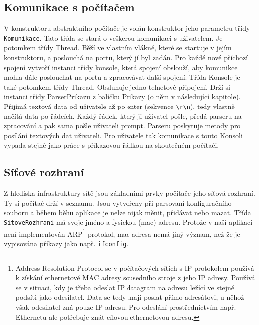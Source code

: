 \subsection{Komunikace s počítačem}

V konstruktoru abstraktního počítače je volán konstruktor jeho parametru třídy \verb|Komunikace|. Tato třída se stará o veškerou komunikaci s uživatelem. Je potomkem třídy Thread. Běží ve vlastním vlákně, které se startuje v jejím konstruktoru, a poslouchá na portu, který jí byl zadán. Pro každé nové příchozí spojení vytvoří instanci třídy konsole, která spojení obslouží, aby komunikce mohla dále poslouchat na portu a zpracovávat další spojení. Třída Konsole je také potomkem třídy Thread. Obsluhuje jedno telnetové připojení. Drží si instanci třídy ParserPrikazu z balíčku Prikazy (o něm v následující kapitole). Přijímá textová data od uživatele až po enter (sekvence \verb|\r\n|), tedy vlastně načítá data po řádcích. Každý řádek, který ji uživatel pošle, předá parseru na zpracování a pak sama pošle uživateli prompt. Parseru poskytuje metody pro posílání textových dat uživateli. Pro uživatele tak komunikace s touto Konsoli vypada stejně jako práce s příkazovou řádkou na skoutečném počítači.


\subsection{Síťové rozhraní}

Z hlediska infrastruktury sítě jsou základními prvky počítače jeho síťová rozhraní. Ty si počítač drží v seznamu. Jsou vytvořeny při parsovaní konfiguračního souboru a během běhu aplikace je nelze nijak měnit, přidávat nebo mazat. Třída \verb|SitoveRozhrani| má svoje jméno a fysickou (mac) adresu. Protože v naší aplikaci není implementován ARP\footnote{Address Resolution Protocol se v počítačových sítích s IP protokolem používá k získání ethernetové MAC adresy sousedního stroje z jeho IP adresy. Používá se v situaci, kdy je třeba odeslat IP datagram na adresu ležící ve stejné podsíti jako odesílatel. Data se tedy mají poslat přímo adresátovi, u něhož však odesilatel zná pouze IP adresu. Pro odeslání prostřednictvím např. Ethernetu ale potřebuje znát cílovou ethernetovou adresu.\cite{wiki:arp}} protokol, mac adresa nemá jiný význam, než že je vypisována příkazy jako např. \verb|ifconfig|.

